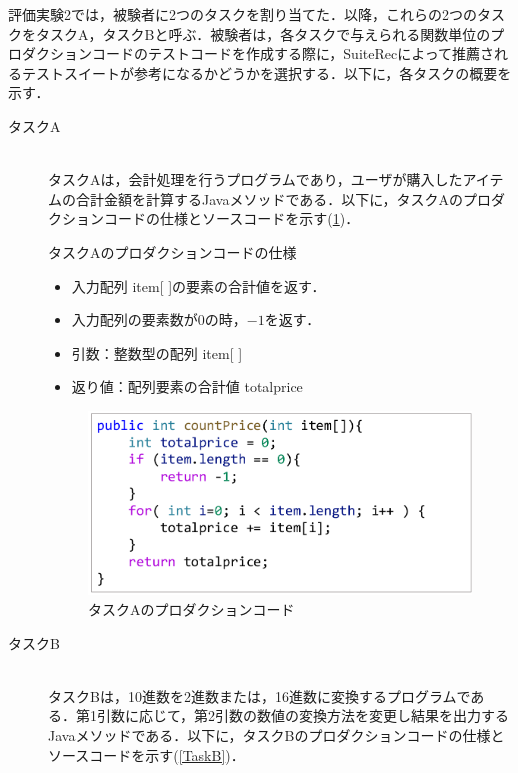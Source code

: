 \documentclass[12pt]{jarticle} %
\begin{document}
評価実験2では，被験者に2つのタスクを割り当てた．以降，これらの2つのタスクをタスクA，タスクBと呼ぶ．被験者は，各タスクで与えられる関数単位のプロダクションコードのテストコードを作成する際に，{\sf SuiteRec}によって推薦されるテストスイートが参考になるかどうかを選択する．以下に，各タスクの概要を示す．

\begin{description}
\item[タスクA]~\\
タスクAは，会計処理を行うプログラムであり，ユーザが購入したアイテムの合計金額を計算するJavaメソッドである．以下に，タスクAのプロダクションコードの仕様とソースコードを示す(\ref{TaskA})．
\begin{itembox}[l]{タスクAのプロダクションコードの仕様}
\begin{itemize}
\item 入力配列 item[ ]の要素の合計値を返す．
\item 入力配列の要素数が0の時，$-1$を返す．
\item 引数：整数型の配列 item[ ]
\item 返り値：配列要素の合計値 totalprice
\end{itemize}
\end{itembox}

\begin{figure}[htbp]
\begin{center}
\includegraphics[clip,width=12cm]{taskA.pdf}
\caption{タスクAのプロダクションコード}
\label{TaskA}
\end{center}
\end{figure}

\item[タスクB]~\\
タスクBは，10進数を2進数または，16進数に変換するプログラムである．第1引数に応じて，第2引数の数値の変換方法を変更し結果を出力するJavaメソッドである．以下に，タスクBのプロダクションコードの仕様とソースコードを示す(\ref{TaskB})．



\end{description}
\end{document}
